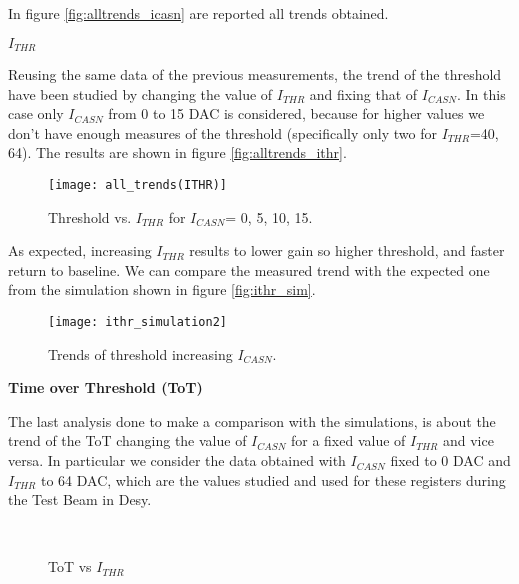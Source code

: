 In figure \vref{fig:alltrends_icasn} are reported all trends obtained.


\begin{description}
\item[\textbf{$I_{THR}$}]
\end{description}

Reusing the same data of the previous measurements, the trend of the threshold have been studied by changing the value of $I_{THR}$ and fixing that of $I_{CASN}$. In this case only $I_{CASN}$ from 0 to 15 DAC is considered, because for higher values we don't have enough measures of the threshold (specifically only two for $I_{THR}$=40, 64). The results are shown in figure \vref{fig:alltrends_ithr}.

\begin{figure}[h!]
\centering
\texttt{[image: all\_trends(ITHR)]}
\caption{Threshold vs. $I_{THR}$ for $I_{CASN}$= 0, 5, 10, 15.}
\label{fig:alltrends_ithr}
\end{figure}

As expected, increasing $I_{THR}$ results to lower gain so higher threshold, and faster return to baseline. 
We can compare the measured trend with the expected one from the simulation shown in figure \vref{fig:ithr_sim}. 

\begin{figure}[h!]
\centering
\texttt{[image: ithr\_simulation2]}
\caption{Trends of threshold increasing $I_{CASN}$.}
\label{fig:ithr_sim}
\end{figure}

\begin{description}
\item[\textbf{Time over Threshold (ToT)}]
\end{description}

The last analysis done to make a comparison with the simulations, is about the trend of the ToT changing the value of $I_{CASN}$ for a fixed value of $I_{THR}$ and vice versa. In particular we consider the data obtained with $I_{CASN}$ fixed to 0 DAC and $I_{THR}$ to 64 DAC, which are the values studied and used for these registers during the Test Beam in Desy.

\begin{figure}[h!]
\centering
{}\quad
{}\\
\caption{ToT vs $I_{THR}$}
\label{fig:tot_vs_ithr}
\end{figure}

